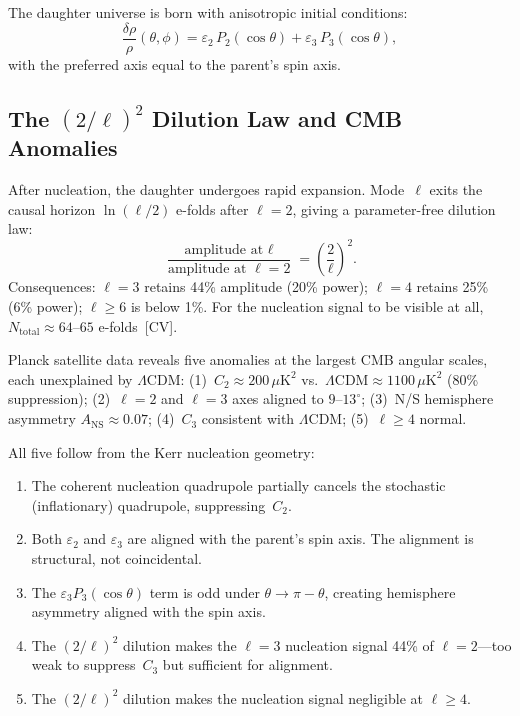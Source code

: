 \documentclass[11pt,a4paper]{article}
\theoremstyle{plain}
\theoremstyle{definition}
\theoremstyle{remark}
\begin{document}
The daughter universe is born with anisotropic initial conditions:
\begin{equation}
  \frac{\delta\rho}{\rho}(\theta,\phi) =
  \varepsilon_2\,P_2(\cos\theta) +
  \varepsilon_3\,P_3(\cos\theta),
  \label{eq:daughter_ic}
\end{equation}
with the preferred axis equal to the parent's spin axis.

\subsection{The $(2/\ell)^2$ Dilution Law and CMB Anomalies}
\label{sec:cmb_anomalies}

After nucleation, the daughter undergoes rapid expansion.
Mode~$\ell$ exits the causal horizon $\ln(\ell/2)$ e-folds
after $\ell = 2$, giving a parameter-free dilution law:
\begin{equation}
  \frac{\text{amplitude at }\ell}{\text{amplitude at }\ell = 2}
  = \left(\frac{2}{\ell}\right)^{\!2}.
  \label{eq:dilution}
\end{equation}
Consequences: $\ell = 3$ retains 44\% amplitude (20\% power);
$\ell = 4$ retains 25\% (6\% power); $\ell \geq 6$ is below 1\%.
For the nucleation signal to be visible at all,
$N_{\mathrm{total}} \approx 64$--$65$ e-folds~[CV].

Planck satellite data reveals five anomalies at the largest CMB
angular scales, each unexplained by $\Lambda$CDM:
(1)~$C_2 \approx 200\,\mu\mathrm{K}^2$ vs.\
$\Lambda\mathrm{CDM} \approx 1100\,\mu\mathrm{K}^2$ (80\%
suppression); (2)~$\ell = 2$ and $\ell = 3$ axes aligned to
$9$--$13^\circ$; (3)~N/S hemisphere asymmetry
$A_{\mathrm{NS}} \approx 0.07$; (4)~$C_3$ consistent with
$\Lambda$CDM; (5)~$\ell \geq 4$ normal.

All five follow from the Kerr nucleation geometry:
\begin{enumerate}[nosep]
\item The coherent nucleation quadrupole partially cancels the
  stochastic (inflationary) quadrupole, suppressing~$C_2$.
\item Both $\varepsilon_2$ and $\varepsilon_3$ are aligned with the
  parent's spin axis. The alignment is structural, not coincidental.
\item The $\varepsilon_3 P_3(\cos\theta)$ term is odd under
  $\theta \to \pi - \theta$, creating hemisphere asymmetry aligned
  with the spin axis.
\item The $(2/\ell)^2$ dilution makes the $\ell = 3$ nucleation
  signal 44\% of $\ell = 2$---too weak to suppress~$C_3$ but
  sufficient for alignment.
\item The $(2/\ell)^2$ dilution makes the nucleation signal
  negligible at $\ell \geq 4$.
\end{enumerate}
\end{document}
